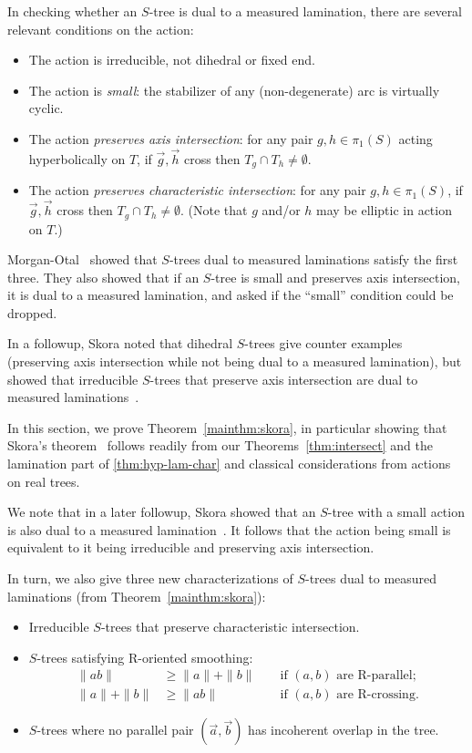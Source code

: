 \documentclass[11pt]{amsart}
\newcommand{\ora}[1]{\overrightarrow{#1}}
\numberwithin{equation}{section}
\numberwithin{figure}{section}
\theoremstyle{definition}
\theoremstyle{plain}
\begin{document}
In checking whether an $S$-tree is dual to a measured
lamination, there are several relevant conditions on the action:
\begin{itemize}
\item The action is irreducible, not dihedral or fixed end.
\item The action is \emph{small}: the stabilizer of any
  (non-degenerate) arc is virtually cyclic.
\item The action  \emph{preserves axis intersection}: for any pair
  $g,h \in \pi_1(S)$ acting hyperbolically on $T$, if
  $\ora{g},\ora{h}$ cross then $T_g \cap T_h \neq \emptyset$.
\item The action  \emph{preserves characteristic intersection}: for any pair
  $g,h \in \pi_1(S)$, if
  $\ora{g},\ora{h}$ cross then $T_g \cap T_h \neq \emptyset$. (Note
  that $g$ and/or $h$ may be elliptic in action on $T$.)
\end{itemize}
Morgan-Otal~\cite{MO93:RelativeGrowths} showed that $S$-trees dual to measured laminations
satisfy the first three. They also showed that if an $S$-tree
is small and preserves axis intersection, it is dual to a measured
lamination, and asked if the ``small'' condition could be dropped.

In a followup, Skora noted that dihedral
$S$-trees give counter examples (preserving axis intersection while not
being dual to a measured lamination), but showed that irreducible
$S$-trees that preserve axis intersection are dual to measured
laminations~\cite{Sko90:GeometricAction}.

In this section, we prove Theorem~\ref{mainthm:skora}, in particular showing
that Skora's theorem~\cite{Sko90:GeometricAction} follows readily from
our Theorems~\ref{thm:intersect} and the lamination part of
\ref{thm:hyp-lam-char} and classical considerations
from actions on real trees.

We note that in a later followup,  Skora showed that an $S$-tree with
a small action is also
dual to a measured lamination~\cite{Sk96:Splittings}.
It follows that the action being small is equivalent to it being irreducible and preserving axis intersection.

In turn, we also give three new characterizations of $S$-trees
dual to measured laminations (from Theorem~\ref{mainthm:skora}):
\begin{itemize}
\item Irreducible $S$-trees that preserve characteristic intersection.
\item $S$-trees satisfying R-oriented smoothing:
 \begin{align}
\|ab\| &\geq  \|a \| + \|b\| && \mbox{ if } (a,b)\mbox{ are } \mbox{R-parallel;} \\
\|a\| + \|b\| &\geq \|ab\|  && \mbox{ if }  (a,b)\mbox{ are } \mbox{R-crossing}.
  \end{align}
\item $S$-trees where no parallel pair $(\ora{a},\ora{b})$ has incoherent overlap in the tree.
\end{itemize}
\end{document}
